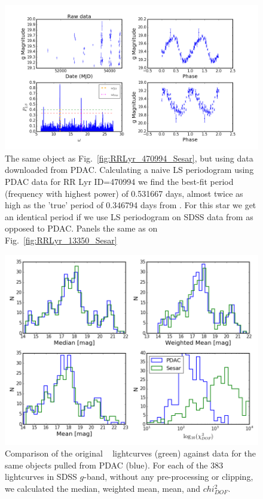 \documentclass[DM,lsstdraft,toc,usenatbib]{lsstdoc}
\begin{document}
\begin{figure}
\includegraphics[width=\textwidth]{figs/Fig_2_RRLyr_LS_periodogram_ID_470994_gPDAC}
\caption{ The same object as Fig.~\ref{fig:RRLyr_470994_Sesar}, but using data downloaded from PDAC. Calculating a naive LS periodogram using PDAC data for RR Lyr ID=470994 we find the  best-fit period (frequency with highest power) of 0.531667  days, almost twice as high as the 'true'  period of 0.346794 days from  \citep{sesar2010}. For this star we get an identical period if we use LS periodogram on SDSS data from \citep{sesar2010} as opposed to PDAC. Panels the same as on Fig.~\ref{fig:RRLyr_13350_Sesar}}
\label{fig:RRLyr_470994_PDAC}
\end{figure}


\begin{figure}
\includegraphics[width=\columnwidth]{figs/Fig_PDAC_sesar_compare}
\caption{Comparison of the original ~\citep{sesar2010}  lightcurves (green) against data for the same objects  pulled from PDAC (blue). For each of the 383 lightcurves in SDSS $g$-band, without any pre-processing or clipping, we calculated the median, weighted mean, mean, and $chi^{2}_{DOF}$. }
\label{fig:PDAC_SDSS_comp}
\end{figure}
\end{document}
